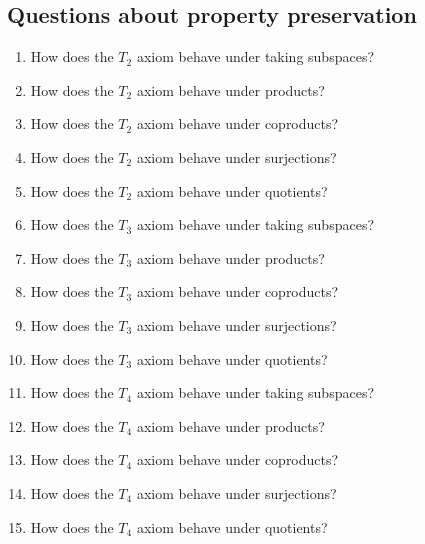 \subsection{Questions about property preservation}

\begin{enumerate}
    \item How does the \( T_2 \) axiom behave under taking subspaces?
    \item How does the \( T_2 \) axiom behave under products?
    \item How does the \( T_2 \) axiom behave under coproducts?
    \item How does the \( T_2 \) axiom behave under surjections?
    \item How does the \( T_2 \) axiom behave under quotients?
    \item How does the \( T_3 \) axiom behave under taking subspaces?
    \item How does the \( T_3 \) axiom behave under products?
    \item How does the \( T_3 \) axiom behave under coproducts?
    \item How does the \( T_3 \) axiom behave under surjections?
    \item How does the \( T_3 \) axiom behave under quotients?
    \item How does the \( T_4 \) axiom behave under taking subspaces?
    \item How does the \( T_4 \) axiom behave under products?
    \item How does the \( T_4 \) axiom behave under coproducts?
    \item How does the \( T_4 \) axiom behave under surjections?
    \item How does the \( T_4 \) axiom behave under quotients?
\end{enumerate}
